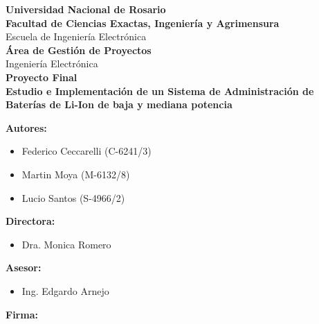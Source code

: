 \documentclass[10pt,a4paper]{article}
\begin{document}
\begin{titlepage}
\begin{center}
			\large{ \textbf{Universidad Nacional de Rosario}} \\[5mm]
			\textbf{Facultad de Ciencias Exactas, Ingeniería y Agrimensura} \\[5mm]
			Escuela de Ingeniería Electrónica \\[20mm]
			\Large {\textbf{Área de Gestión de Proyectos}}\\[1.5mm]
			\small {Ingeniería Electrónica} \\[20mm]
			\Large {\textbf{Proyecto Final}} \\[5mm]
			\Large{ \textbf{Estudio e Implementación de un Sistema de Administración de Baterías de Li-Ion de baja y mediana potencia}} \\[15mm]
			
		\end{center}

		\begin{minipage}[t]{0.6\textwidth}
			{\large\textbf{Autores:}}
			\begin{itemize}
				\item [] Federico Ceccarelli (C-6241/3)
				\item [] Martin Moya (M-6132/8)
				\item [] Lucio Santos (S-4966/2)
			\end{itemize}
			\vspace{10pt}
			{\large\textbf{Directora:}}
			\begin{itemize}
			     \item [] Dra. Monica Romero
			\end{itemize}
            \vspace{10pt}
			{\large\textbf{Asesor:}}
			 \begin{itemize}
                 \item [] Ing. Edgardo Arnejo
            \end{itemize}
			
		\end{minipage}
		\begin{minipage}[t]{0.35\textwidth}
            \flushleft
			\Large\textbf{Firma:}
		\end{minipage}

	\end{titlepage}
    
    \newpage
    
\end{document}
